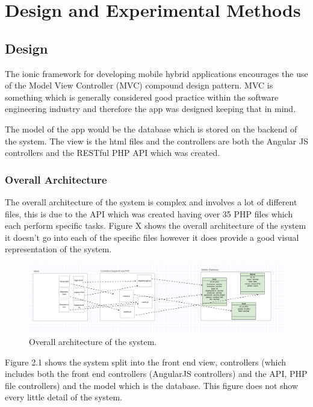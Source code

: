 \chapter{Design and Experimental Methods}
\section{Design}
The ionic framework for developing mobile hybrid applications encourages the use of the Model View Controller (MVC) compound design pattern. MVC is something which is generally considered good practice within the software engineering industry and therefore the app was designed keeping that in mind.

The model of the app would be the database which is stored on the backend of the system. The view is the html files and the controllers are both the Angular JS controllers and the RESTful PHP API which was created.

\subsection{Overall Architecture}
The overall architecture of the system is complex and involves a lot of different files, this is due to the API which was created having over 35 PHP files which each perform specific tasks. Figure X shows the overall architecture of the system it doesn't go into each of the specific files however it does provide a good visual representation of the system.

\begin{figure}
\includegraphics[width=\textwidth,height=\textheight,keepaspectratio]{images/overall}
\caption{Overall architecture of the system.}
\end{figure}

Figure 2.1 shows the system split into the front end view, controllers (which includes both the front end controllers (AngularJS controllers) and the API, PHP file controllers) and the model which is the database. This figure does not show every little detail of the system.


